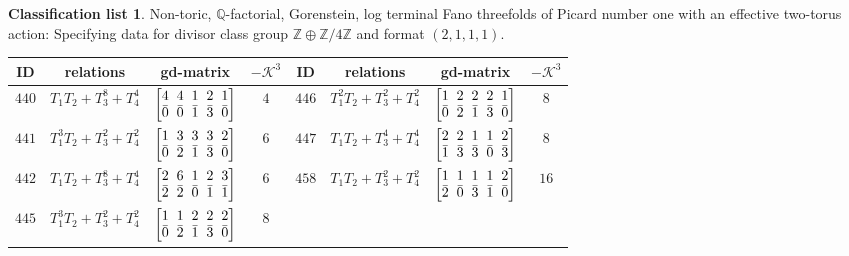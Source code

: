 \documentclass[pdftex]{sigma}%
\theoremstyle{definition}
\newtheorem{class-list}[thm]{Classification list}
\def\ZZ{{\mathbb Z}}
\def\QQ{{\mathbb Q}}
\numberwithin{equation}{section}
\begin{document}
\begin{class-list}
Non-toric, $\QQ$-factorial, Gorenstein, log terminal Fano
threefolds of Picard number one with an effective two-torus action:
Specifying data for divisor class group $\ZZ\oplus \ZZ/4\ZZ$ and
format $(2,1,1,1)$.
\begin{table}[h!]\centering\setlength{\tabcolsep}{3.5pt}
\renewcommand{\arraystretch}{1.15}\small\tabulinesep=1mm
\begin{tabu}{c|c|c|c||c|c|c|c}
\hline
ID&relations&gd-matrix&$-\mathcal{K}^3$&ID&relations&gd-matrix&$-\mathcal{K}^3$
\\
\hline
${440}$&${T_{1}T_{2}+T_{3}^{8}+T_{4}^{4}}$
&$\arraycolsep=1mm\begin{bmatrix}{4} & {4} & {1} & {2} & {1} \\ {\bar{0}} & {\bar{0}} & {\bar{1}} & {\bar{3}} & {\bar{0}}\end{bmatrix}$&${4}$
&${446}$&${T_{1}^{2}T_{2}+T_{3}^{2}+T_{4}^{2}}$
&$\arraycolsep=1mm\begin{bmatrix}{1} & {2} & {2} & {2} & {1} \\ {\bar{0}} & {\bar{2}} & {\bar{1}} & {\bar{3}} & {\bar{0}}\end{bmatrix}$&${8}$
\\
\hline
${441}$&${T_{1}^{3}T_{2}+T_{3}^{2}+T_{4}^{2}}$
&$\arraycolsep=1mm\begin{bmatrix}{1} & {3} & {3} & {3} & {2} \\ {\bar{0}} & {\bar{2}} & {\bar{1}} & {\bar{3}} & {\bar{0}}\end{bmatrix}$&${6}$
&${447}$&${T_{1}T_{2}+T_{3}^{4}+T_{4}^{4}}$
&$\arraycolsep=1mm\begin{bmatrix}{2} & {2} & {1} & {1} & {2} \\ {\bar{1}} & {\bar{3}} & {\bar{3}} & {\bar{0}} & {\bar{3}}\end{bmatrix}$&${8}$
\\
\hline
${442}$&${T_{1}T_{2}+T_{3}^{8}+T_{4}^{4}}$
&$\arraycolsep=1mm\begin{bmatrix}{2} & {6} & {1} & {2} & {3} \\ {\bar{2}} & {\bar{2}} & {\bar{0}} & {\bar{1}} & {\bar{1}}\end{bmatrix}$&${6}$
&${458}$&${T_{1}T_{2}+T_{3}^{2}+T_{4}^{2}}$
&$\arraycolsep=1mm\begin{bmatrix}{1} & {1} & {1} & {1} & {2} \\ {\bar{2}} & {\bar{0}} & {\bar{3}} & {\bar{1}} & {\bar{0}}\end{bmatrix}$&${16}$
\\
\hline
${445}$&${T_{1}^{3}T_{2}+T_{3}^{2}+T_{4}^{2}}$
&$\arraycolsep=1mm\begin{bmatrix}{1} & {1} & {2} & {2} & {2} \\ {\bar{0}} & {\bar{2}} & {\bar{1}} & {\bar{3}} & {\bar{0}}\end{bmatrix}$&${8}$
\\
\end{tabu}%
\end{table}
\end{class-list}
\end{document}
